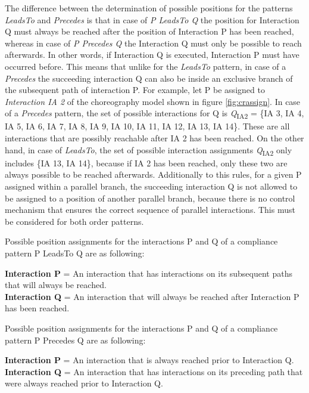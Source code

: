 The difference between the determination of possible positions for the patterns \textit{LeadsTo} and \textit{Precedes} is that in case of \textit{P LeadsTo Q} the position for Interaction Q must always be reached after the position of Interaction P has been reached, whereas in case of \textit{P Precedes Q} the Interaction Q must only be possible to reach afterwards. In other words, if Interaction Q is executed, Interaction P must have occurred before. This means that unlike for the \textit{LeadsTo} pattern, in case of a \textit{Precedes} the succeeding interaction Q can also be inside an exclusive branch of the subsequent path of interaction P. For example, let P be assigned to \textit{Interaction IA 2} of the choreography model shown in figure \ref{fig:crassign}. In case of a \textit{Precedes} pattern, the set of possible interactions for Q is \textit{Q}\textsubscript{IA2} = \{IA 3, IA 4, IA 5, IA 6, IA 7, IA 8, IA 9, IA 10, IA 11, IA 12, IA 13, IA 14\}. These are all interactions that are possibly reachable after IA 2 has been reached. On the other hand, in case of \textit{LeadsTo}, the set of possible interaction assignments \textit{Q}\textsubscript{IA2} only includes \{IA 13, IA 14\}, because if IA 2 has been reached, only these two are always possible to be reached afterwards. Additionally to this rules, for a given P assigned within a parallel branch, the succeeding interaction Q is not allowed to be assigned to a position of another parallel branch, because there is no control mechanism that ensures the correct sequence of parallel interactions. This must be considered for both order patterns.

\begin{Def}
	Possible position assignments for the interactions P and Q of a compliance pattern P LeadsTo Q are as following:
	\begin{center}
		\textbf{Interaction P} = An interaction that has interactions on its subsequent paths that will always be reached.\\
		\textbf{Interaction Q} = An interaction that will always be reached after Interaction P has been reached.\\
	\end{center}
	\label{def:leadsto}
\end{Def}

\begin{Def}
	Possible position assignments for the interactions P and Q of a compliance pattern P Precedes Q are as following:
	\begin{center}
		\textbf{Interaction P} = An interaction that is always reached prior to Interaction Q.\\
		\textbf{Interaction Q} = An interaction that has interactions on its preceding path that were always reached prior to Interaction Q.\\
	\end{center}
	\label{def:precedes}
\end{Def}

